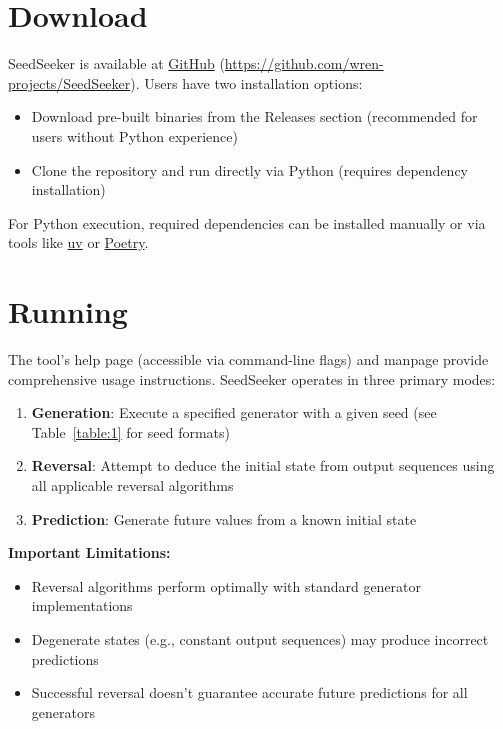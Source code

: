\documentclass[12pt, a4paper]{report}
\begin{document}
\section{Download}
SeedSeeker is available at \href{https://github.com/wren-projects/SeedSeeker}{GitHub} 
(\url{https://github.com/wren-projects/SeedSeeker}). Users have two installation options:

\begin{itemize}
    \item Download pre-built binaries from the Releases section (recommended for users without Python experience)
    \item Clone the repository and run directly via Python (requires dependency installation)
\end{itemize}

For Python execution, required dependencies can be installed manually or via tools like 
\href{https://github.com/astral-sh/uv}{uv} or \href{https://python-poetry.org}{Poetry}.

\section{Running}
The tool's help page (accessible via command-line flags) and manpage provide comprehensive usage instructions. 
SeedSeeker operates in three primary modes:

\begin{enumerate}
    \item \textbf{Generation}: Execute a specified generator with a given seed 
        (see Table~\ref{table:1} for seed formats)
    \item \textbf{Reversal}: Attempt to deduce the initial state 
        from output sequences using all applicable reversal algorithms
    \item \textbf{Prediction}: Generate future values from a known initial state
\end{enumerate}

\textbf{Important Limitations:}
\begin{itemize}
    \item Reversal algorithms perform optimally with standard generator implementations
    \item Degenerate states (e.g., constant output sequences) may produce incorrect predictions
    \item Successful reversal doesn't guarantee accurate future predictions for all generators
\end{itemize}
\end{document}
